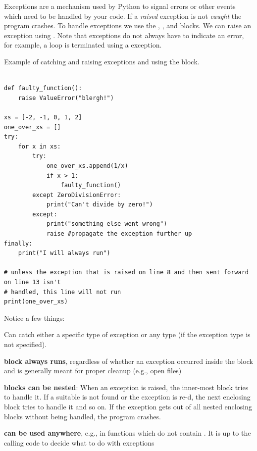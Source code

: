 \begin{syntax}
    \label{syn:exceptions}
    Exceptions are a mechanism used by Python to signal errors or other events which need to be handled by your code. If a \emph{raised} exception is not \emph{caught} the program crashes. To handle exceptions we use the , , and  blocks. We can raise an exception using . Note that exceptions do not always have to indicate an error, for example, a  loop is terminated using a  exception.

    Example of catching and raising exceptions and using the  block.
\begin{lstlisting}

def faulty_function():
    raise ValueError("blergh!")

xs = [-2, -1, 0, 1, 2]
one_over_xs = []
try:
    for x in xs:
        try:
            one_over_xs.append(1/x)
            if x > 1:
                faulty_function()
        except ZeroDivisionError:
            print("Can't divide by zero!")
        except:
            print("something else went wrong")
            raise #propagate the exception further up
finally:
    print("I will always run")

# unless the exception that is raised on line 8 and then sent forward on line 13 isn't
# handled, this line will not run
print(one_over_xs)
\end{lstlisting}
    Notice a few things:
    
    \textbf{} Can catch either a specific type of exception or any type (if the exception type is not specified).
    
    \textbf{ block always runs}, regardless of whether an exception occurred inside the  block and is generally meant for proper cleanup (e.g., open files)
        
    \textbf{ blocks can be nested}: When an exception is raised, the inner-most  block tries to handle it. If a suitable  is not found or the exception is re-d, the next enclosing  block tries to handle it and so on. If the exception gets out of all nested enclosing  blocks without being handled, the program crashes.
    
    \textbf{ can be used anywhere}, e.g., in functions which do not contain . It is up to the calling code to decide what to do with exceptions
\end{syntax}

